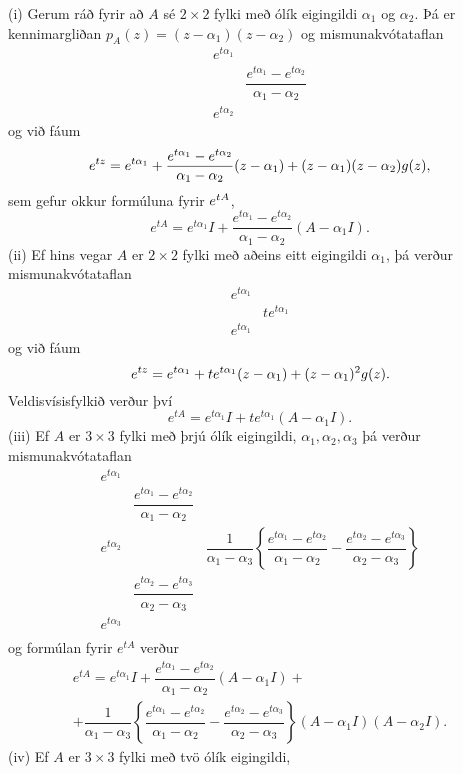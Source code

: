 \begin{sy}\label{syn5.7.2} (i) Gerum ráð fyrir að $A$ sé $2\times 2$ fylki með ólík
eigingildi $\alpha_1$ og $\alpha_2$.  Þá er 
kennimargliðan $p_A(z)=(z-\alpha_1)(z-\alpha_2)$ og mismunakvótataflan
 $$\begin{matrix}
e^{t\alpha_1}\\
&\dfrac{e^{t\alpha_1}-e^{t\alpha_2}}{\alpha_1-\alpha_2}\\
e^{t\alpha_2}
\end{matrix}
 $$
og við fáum 
 $$e\sp{tz} = e\sp{t\alpha_1}+ 
\dfrac{e^{t\alpha_1}-e^{t\alpha_2}}{\alpha_1-\alpha_2}
(z-\alpha_1) +(z-\alpha_1)(z-\alpha_2)g(z),
 $$
sem gefur okkur formúluna fyrir $e\sp{tA}$, 
 $$e^{tA}=e^{t\alpha_1}I+\dfrac{e^{t\alpha_1}-e^{t\alpha_2}}
{\alpha_1-\alpha_2}(A-\alpha_1I).
 $$
(ii) Ef hins vegar $A$ er $2\times 2$ fylki með aðeins eitt
eigingildi $\alpha_1$, þá verður mismunakvótataflan
 $$\begin{matrix}
e^{t\alpha_1}\\
&te^{t\alpha_1}\\
e^{t\alpha_1}
\end{matrix}
 $$
og við fáum 
 $$e\sp{tz}=e\sp{t\alpha_1}+te\sp{t\alpha_1}(z-\alpha_1)+(z-\alpha_1)\sp
2g(z). 
 $$
Veldisvísisfylkið verður því
 $$e^{tA}=e^{t\alpha_1}I+te^{t\alpha_1}(A-\alpha_1I).
 $$
(iii)  Ef $A$ er $3\times 3$ fylki með þrjú ólík eigingildi,
${\alpha}_1,{\alpha}_2,{\alpha}_3$ þá verður mismunakvótataflan
 $$\begin{matrix}
e^{t{\alpha}_1}\\
&\dfrac{e^{t\alpha_1}-e^{t\alpha_2}}{\alpha_1-\alpha_2}\\
e^{t\alpha_2}& 
&\dfrac1{\alpha_1-\alpha_3}\left\{
\dfrac{e^{t\alpha_1}-e^{t\alpha_2}}{\alpha_1-\alpha_2}-
\dfrac{e^{t\alpha_2}-e^{t\alpha_3}}{\alpha_2-\alpha_3}
\right\}\\ 
&\dfrac{e^{t\alpha_2}-e^{t\alpha_3}}{\alpha_2-\alpha_3}\\
e^{t\alpha_3}\\
\end{matrix}
 $$
og formúlan fyrir $e^{tA}$ verður
\begin{multline*}
e^{tA}=e^{t\alpha_1}I+\dfrac{e^{t\alpha_1}-e^{t\alpha_2}}
{\alpha_1-\alpha_2}(A-\alpha_1I)+\\
+\dfrac1{\alpha_1-\alpha_3}\left\{
\dfrac{e^{t\alpha_1}-e^{t\alpha_2}}{\alpha_1-\alpha_2}-
\dfrac{e^{t\alpha_2}-e^{t\alpha_3}}{\alpha_2-\alpha_3}
\right\} (A-\alpha_1I)(A-\alpha_2I).
\end{multline*}
(iv)  Ef $A$ er $3\times 3$ fylki með tvö ólík eigingildi,

\end{sy}

